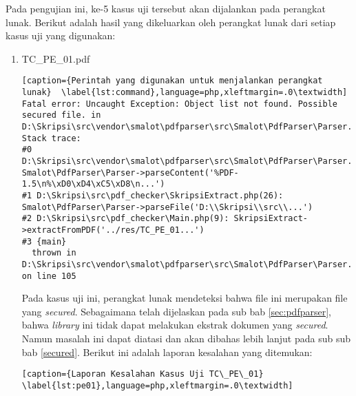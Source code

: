 Pada pengujian ini, ke-5 kasus uji tersebut akan dijalankan pada perangkat lunak. Berikut adalah hasil yang dikeluarkan oleh perangkat lunak dari setiap kasus uji yang digunakan:

\begin{enumerate}
	\item TC\_PE\_01.pdf
	
\begin{lstlisting}[caption={Perintah yang digunakan untuk menjalankan perangkat lunak}	\label{lst:command},language=php,xleftmargin=.0\textwidth]
Fatal error: Uncaught Exception: Object list not found. Possible secured file. in D:\Skripsi\src\vendor\smalot\pdfparser\src\Smalot\PdfParser\Parser.php:105
Stack trace:
#0 D:\Skripsi\src\vendor\smalot\pdfparser\src\Smalot\PdfParser\Parser.php(81): Smalot\PdfParser\Parser->parseContent('%PDF-1.5\n%\xD0\xD4\xC5\xD8\n...')
#1 D:\Skripsi\src\pdf_checker\SkripsiExtract.php(26): Smalot\PdfParser\Parser->parseFile('D:\\Skripsi\\src\\...')
#2 D:\Skripsi\src\pdf_checker\Main.php(9): SkripsiExtract->extractFromPDF('../res/TC_PE_01...')
#3 {main}
  thrown in D:\Skripsi\src\vendor\smalot\pdfparser\src\Smalot\PdfParser\Parser.php on line 105
\end{lstlisting}

	Pada kasus uji ini, perangkat lunak mendeteksi bahwa file ini merupakan file yang \textit{secured}. Sebagaimana telah dijelaskan pada sub bab \ref{sec:pdfparser}, bahwa \textit{library} ini tidak dapat melakukan ekstrak dokumen yang \textit{secured}. Namun masalah ini dapat diatasi dan akan dibahas lebih lanjut pada sub sub bab \ref{secured}. Berikut ini adalah laporan kesalahan yang ditemukan:

\begin{lstlisting}[caption={Laporan Kesalahan Kasus Uji TC\_PE\_01}	\label{lst:pe01},language=php,xleftmargin=.0\textwidth]


\end{lstlisting}
\end{enumerate}
